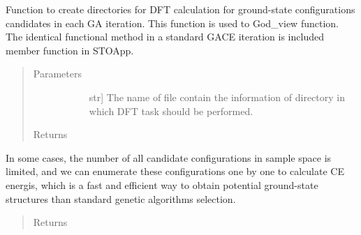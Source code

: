 \documentclass[letterpaper,10pt,english]{sphinxmanual}
\begin{document}
\begin{fulllineitems}
\begin{fulllineitems}
\label{\detokenize{pygace.examples.sto:pygace.examples.sto.sto_gace.Runner.create_dir_for_DFT}}
Function to create directories for DFT calculation for ground-state
configurations candidates in each GA iteration. This function is used
to God\_view function. The identical functional method in a standard
GACE iteration is included  member function in STOApp.
\begin{quote}\begin{description}
\item[{Parameters}] \leavevmode\begin{description}
\item[{}] \leavevmode{[}str{]}
The name of file contain the information of directory in which
DFT task should be performed.

\end{description}

\item[{Returns}] \leavevmode\begin{description}
\item[{}] \leavevmode
\end{description}

\end{description}\end{quote}

\end{fulllineitems}


\begin{fulllineitems}
\label{\detokenize{pygace.examples.sto:pygace.examples.sto.sto_gace.Runner.god_view}}
In some cases, the number of all candidate configurations in sample
space is limited, and we can enumerate these configurations one by one
to calculate CE energis, which is a fast and efficient way to obtain
potential ground-state structures than standard genetic algorithms selection.
\begin{quote}\begin{description}
\item[{Returns}] \leavevmode\begin{description}
\item[{}] \leavevmode
\end{description}


\end{description}
\end{quote}
\end{fulllineitems}
\end{fulllineitems}
\end{document}
